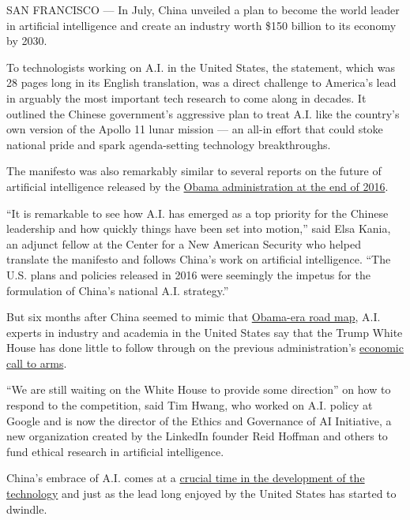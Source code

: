 SAN FRANCISCO --- In July, China unveiled a plan to become the world
leader in artificial intelligence and create an industry worth \$150
billion to its economy by 2030.

To technologists working on A.I. in the United States, the statement,
which was 28 pages long in its English translation, was a direct
challenge to America's lead in arguably the most important tech research
to come along in decades. It outlined the Chinese government's
aggressive plan to treat A.I. like the country's own version of the
Apollo 11 lunar mission --- an all-in effort that could stoke national
pride and spark agenda-setting technology breakthroughs.

The manifesto was also remarkably similar to several reports on the
future of artificial intelligence released by the
\href{https://obamawhitehouse.archives.gov/sites/default/files/whitehouse_files/microsites/ostp/NSTC/national_ai_rd_strategic_plan.pdf}{Obama
administration at the end of 2016}.

``It is remarkable to see how A.I. has emerged as a top priority for the
Chinese leadership and how quickly things have been set into motion,''
said Elsa Kania, an adjunct fellow at the Center for a New American
Security who helped translate the manifesto and follows China's work on
artificial intelligence. ``The U.S. plans and policies released in 2016
were seemingly the impetus for the formulation of China's national A.I.
strategy.''

But six months after China seemed to mimic that
\href{https://obamawhitehouse.archives.gov/blog/2016/10/12/administrations-report-future-artificial-intelligence}{Obama-era
road map}, A.I. experts in industry and academia in the United States
say that the Trump White House has done little to follow through on the
previous administration's
\href{https://obamawhitehouse.archives.gov/sites/whitehouse.gov/files/documents/Artificial-Intelligence-Automation-Economy.PDF}{economic
call to arms}.

``We are still waiting on the White House to provide some direction'' on
how to respond to the competition, said Tim Hwang, who worked on A.I.
policy at Google and is now the director of the Ethics and Governance of
AI Initiative, a new organization created by the LinkedIn founder Reid
Hoffman and others to fund ethical research in artificial intelligence.

China's embrace of A.I. comes at a
\href{https://obamawhitehouse.archives.gov/sites/default/files/page/files/20160707_cea_ai_furman.pdf}{crucial
time in the development of the technology} and just as the lead long
enjoyed by the United States has started to dwindle.


